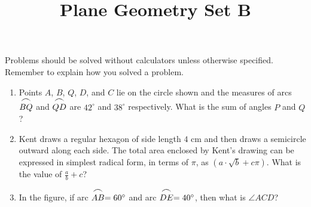 \documentclass{article}
\title{Plane Geometry Set B}
\date{}
\author{}
\begin{document}
\maketitle
\noindent Problems should be solved without calculators unless otherwise specified.
Remember to explain how you solved a problem.
\begin{multicols}{2}
    \begin{enumerate}
        \item Points $A$, $B$, $Q$, $D$, and $C$ lie on the circle shown and the measures of arcs $\stackrel{\mbox{\large$\frown$}}{BQ}$ and $\stackrel{\mbox{\large$\frown$}}{QD}$ are $42^{\circ}$ and $38^{\circ}$ respectively.
            What is the sum of angles $P$ and $Q$?
            \begin{center}
            \end{center}
            \vspace{3cm}
        \item Kent draws a regular hexagon of side length $4$ cm and then draws a semicircle outward along each side.
            The total area enclosed by Kent's drawing can be expressed in simplest radical form, in terms of $\pi$, as $(a \cdot \sqrt{b} + c\pi)$.
            What is the value of $\frac{a}{b} + c$?
            \vspace{3cm}
        \item In the figure, if arc $\stackrel{\mbox{\large$\frown$}}{AB} = 60^{\circ}$ and arc $\stackrel{\mbox{\large$\frown$}}{DE} = 40^{\circ}$, then what is $\angle ACD$?
            \begin{center}
\end{center}
\end{enumerate}
\end{multicols}
\end{document}

